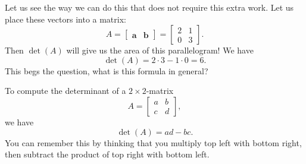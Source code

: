 \begin{example}
        Let us see the way we can do this that does not require this extra work.  Let us place these vectors into a matrix:
        \[
        A=\begin{bmatrix} \mathbf{a} & \mathbf{b} \end{bmatrix}=
        \begin{bmatrix} 2 & 1\\ 0 & 3 \end{bmatrix}.
        \]
        Then $\det(A)$ will give us the area of this parallelogram! We have
        \[
        \det(A)=2\cdot 3 - 1\cdot 0 = 6.
        \]
        This begs the question, what is this formula in general?
        \end{example}
        
        To compute the determinant of a $2\times 2$-matrix
        \[
        A=\begin{bmatrix} a & b\\ c & d \end{bmatrix},
        \]
        we have
        \[
        \det(A) = ad-bc.
        \]
        You can remember this by thinking that you multiply top left with bottom right, then subtract the product of top right with bottom left.  
